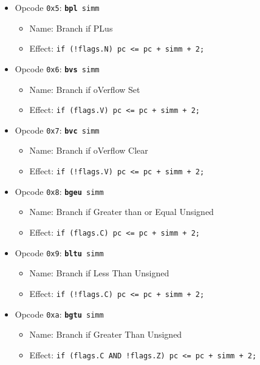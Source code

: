 \documentclass{article}
\begin{document}
\begin{itemize}
		\item Opcode \texttt{0x5}:
			\texttt{\textbf{bpl} simm}
		\begin{itemize}
			\item Name: Branch if PLus
			\item Effect:
				\texttt{if (!flags.N) pc <= pc + simm + 2;}
		\end{itemize}

		\item Opcode \texttt{0x6}:
			\texttt{\textbf{bvs} simm}
		\begin{itemize}
			\item Name: Branch if oVerflow Set
			\item Effect:
				\texttt{if (flags.V) pc <= pc + simm + 2;}
		\end{itemize}

		\item Opcode \texttt{0x7}:
			\texttt{\textbf{bvc} simm}
		\begin{itemize}
			\item Name: Branch if oVerflow Clear
			\item Effect:
				\texttt{if (!flags.V) pc <= pc + simm + 2;}
		\end{itemize}

		\item Opcode \texttt{0x8}:
			\texttt{\textbf{bgeu} simm}
		\begin{itemize}
			\item Name: Branch if Greater than or Equal Unsigned
			\item Effect:
				\texttt{if (flags.C) pc <= pc + simm + 2;}
		\end{itemize}

		\item Opcode \texttt{0x9}:
			\texttt{\textbf{bltu} simm}
		\begin{itemize}
			\item Name: Branch if Less Than Unsigned
			\item Effect:
				\texttt{if (!flags.C) pc <= pc + simm + 2;}
		\end{itemize}

		\item Opcode \texttt{0xa}:
			\texttt{\textbf{bgtu} simm}
		\begin{itemize}
			\item Name: Branch if Greater Than Unsigned
			\item Effect:
				\texttt{if (flags.C AND !flags.Z) pc <= pc + simm + 2;}
		\end{itemize}


\end{itemize}
\end{document}

